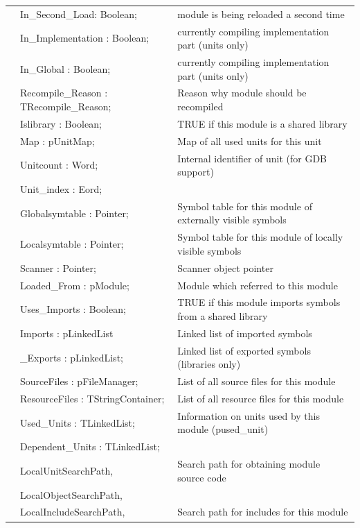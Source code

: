 \documentclass [a4paper,12pt]{article}
\begin{document}
\begin{longtable}{|l@{\extracolsep{\fill}}lp{6cm}|}
&\textsf{In{\_}Second{\_}Load: Boolean;}    & module is being reloaded a second time \\
&\textsf{In{\_}Implementation : Boolean;}& currently compiling implementation part (units only) \\
&\textsf{In{\_}Global : Boolean;}   & currently compiling implementation part (units only) \\
&\textsf{Recompile{\_}Reason : TRecompile{\_}Reason;}& Reason why module should be recompiled \\
&\textsf{Islibrary : Boolean;}&         TRUE if this module is a shared library \\
&\textsf{Map : pUnitMap;}       & Map of all used units for this unit \\
&\textsf{Unitcount : Word;}     & Internal identifier of unit (for GDB support) \\
&\textsf{Unit{\_}index : Eord;}     &  \\
&\textsf{Globalsymtable : Pointer;} & Symbol table for this module of externally visible symbols \\
&\textsf{Localsymtable : Pointer;}  & Symbol table for this module of locally visible symbols \\
&\textsf{Scanner : Pointer;}        & Scanner object pointer \\
&\textsf{Loaded{\_}From : pModule;} & Module which referred to this module \\
&\textsf{Uses{\_}Imports : Boolean;}    & TRUE if this module imports symbols from a shared library \\
&\textsf{Imports : pLinkedList}     & Linked list of imported symbols \\
&\textsf{{\_}Exports : pLinkedList;}    & Linked list of exported symbols (libraries only) \\
&\textsf{SourceFiles : pFileManager;}   & List of all source files for this module \\
&\textsf{ResourceFiles : TStringContainer;} & List of all resource files for this module \\
&\textsf{Used{\_}Units : TLinkedList; } & Information on units used by this module (pused{\_}unit) \\
&\textsf{Dependent{\_}Units : TLinkedList;}&  \\
&\textsf{LocalUnitSearchPath,}& Search path for obtaining module source code \\
&\textsf{LocalObjectSearchPath,}&  \\
&\textsf{LocalIncludeSearchPath,}& Search path for includes for this module \\

\end{longtable}
\end{document}
